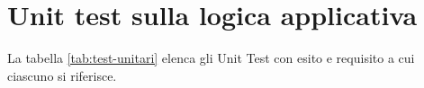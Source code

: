 %

\section{Unit test sulla logica applicativa}\label{sec:test-unitari}

La tabella \ref{tab:test-unitari} elenca gli Unit Test con esito e requisito a cui ciascuno si riferisce.

